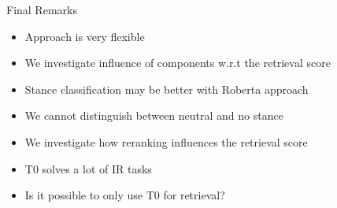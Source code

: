 \documentclass[english]{mlutalk}
\begin{document}
\begin{frame}{Final Remarks}
    \begin{itemize}
        \item Approach is very flexible 
        \item We investigate influence of components w.r.t the retrieval score
        \item Stance classification may be better with Roberta approach
        \item We cannot distinguish between neutral and no stance
        \item We investigate how reranking influences the retrieval score
        \item T0 solves a lot of IR tasks
        \item Is it possible to only use T0 for retrieval?
    \end{itemize}
    \thankyou
\end{frame}

\appendix
\section{\appendixname}

\bibliographyframe
\end{document}
